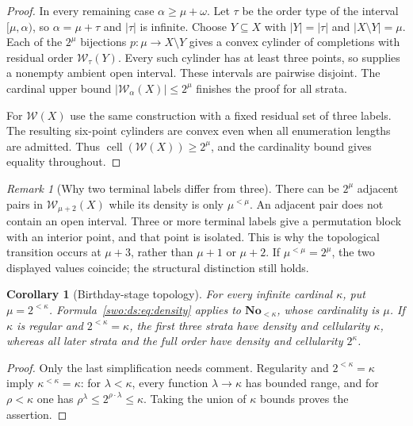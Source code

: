 \documentclass[11pt]{article}
\newtheorem{corollary}[corollary]{Corollary}
\theoremstyle{definition}
\theoremstyle{remark}
\newtheorem{remark}[remark]{Remark}
\newcommand{\No}{\mathbf{No}}
\newcommand{\WO}{\mathcal W}
\newcommand{\cell}{\operatorname{cell}}
\begin{document}
\begin{proof}
In every remaining case $\alpha\ge\mu+\omega$. Let $\tau$ be the
order type of the interval $[\mu,\alpha)$, so $\alpha=\mu+\tau$
and $|\tau|$ is infinite. Choose $Y\subseteq X$ with
$|Y|=|\tau|$ and $|X\setminus Y|=\mu$. Each of the $2^\mu$
bijections $p:\mu\to X\setminus Y$ gives a convex cylinder of
completions with residual order $\WO_\tau(Y)$. Every such cylinder has
at least three points, so supplies a nonempty ambient open interval.
These intervals are pairwise disjoint. The cardinal upper bound
$|\WO_\alpha(X)|\le2^\mu$ finishes the proof for all strata.

For $\WO(X)$ use the same construction with a fixed residual set of
three labels. The resulting six-point cylinders are convex even when all
enumeration lengths are admitted. Thus $\cell(\WO(X))\ge2^\mu$, and the
cardinality bound gives equality throughout.
\end{proof}

\begin{remark}[Why two terminal labels differ from three]\label{swo:ds:n5.3}
There can be $2^\mu$ adjacent pairs in $\WO_{\mu+2}(X)$ while its
density is only $\mu^{<\mu}$. An adjacent pair does not contain an
open interval. Three or more terminal labels give a permutation block
with an interior point, and that point is isolated. This is why the
topological transition occurs at $\mu+3$, rather than $\mu+1$ or
$\mu+2$. If $\mu^{<\mu}=2^\mu$, the two displayed values
coincide; the structural distinction still holds.
\end{remark}

\begin{corollary}[Birthday-stage topology]\label{swo:ds:cor:birthdaytopology}
For every infinite cardinal $\kappa$, put $\mu=2^{<\kappa}$.
Formula~\eqref{swo:ds:eq:density} applies to $\No_{<\kappa}$, whose
cardinality is $\mu$.
If $\kappa$ is regular and $2^{<\kappa}=\kappa$, the first three strata
have density and cellularity $\kappa$, whereas all later strata and the
full order have density and cellularity $2^\kappa$.
\end{corollary}
\begin{proof}
Only the last simplification needs comment. Regularity and
$2^{<\kappa}=\kappa$ imply $\kappa^{<\kappa}=\kappa$: for
$\lambda<\kappa$, every function $\lambda\to\kappa$ has bounded range,
and for $\rho<\kappa$ one has
$\rho^\lambda\le2^{\rho\cdot\lambda}\le\kappa$. Taking the union of
$\kappa$ bounds proves the assertion.
\end{proof}
\end{document}
